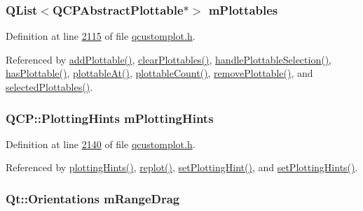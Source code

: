 \hypertarget{a00116_a57ed6eb2e0a767a8344de45110a3e81d}{
\subsubsection[{m\+Plottables}]{\setlength{\rightskip}{0pt plus 5cm}Q\+List$<${\bf Q\+C\+P\+Abstract\+Plottable}$\ast$$>$ m\+Plottables}}\label{a00116_a57ed6eb2e0a767a8344de45110a3e81d}


Definition at line \hyperlink{a00116_source_l02115}{2115} of file \hyperlink{a00116_source}{qcustomplot.\+h}.



Referenced by \hyperlink{a00115_source_l06487}{add\+Plottable()}, \hyperlink{a00115_source_l06560}{clear\+Plottables()}, \hyperlink{a00115_source_l07856}{handle\+Plottable\+Selection()}, \hyperlink{a00115_source_l06635}{has\+Plottable()}, \hyperlink{a00115_source_l06606}{plottable\+At()}, \hyperlink{a00115_source_l06573}{plottable\+Count()}, \hyperlink{a00115_source_l06519}{remove\+Plottable()}, and \hyperlink{a00115_source_l06585}{selected\+Plottables()}.

\hypertarget{a00116_af6de5d56e261af21cf6223179fc58883}{
\subsubsection[{m\+Plotting\+Hints}]{\setlength{\rightskip}{0pt plus 5cm}Q\+C\+P\+::\+Plotting\+Hints m\+Plotting\+Hints}}\label{a00116_af6de5d56e261af21cf6223179fc58883}


Definition at line \hyperlink{a00116_source_l02140}{2140} of file \hyperlink{a00116_source}{qcustomplot.\+h}.



Referenced by \hyperlink{a00116_source_l01981}{plotting\+Hints()}, \hyperlink{a00115_source_l07221}{replot()}, \hyperlink{a00115_source_l06414}{set\+Plotting\+Hint()}, and \hyperlink{a00115_source_l06405}{set\+Plotting\+Hints()}.

\hypertarget{a00116_a8cc4277431ae5ab8e15cf2dfe5c17e1c}{
\subsubsection[{m\+Range\+Drag}]{\setlength{\rightskip}{0pt plus 5cm}Qt\+::\+Orientations m\+Range\+Drag}}\label{a00116_a8cc4277431ae5ab8e15cf2dfe5c17e1c}


